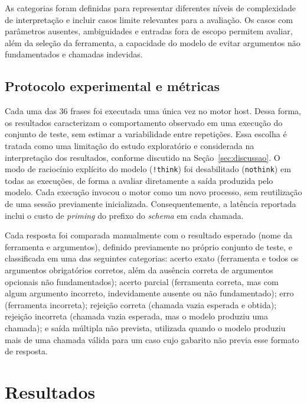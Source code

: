 \documentclass[12pt]{article}
\begin{document}
As categorias foram definidas para representar diferentes níveis de
complexidade de interpretação e incluir casos limite relevantes para a
avaliação. Os casos com parâmetros ausentes, ambiguidades e entradas fora
de escopo permitem avaliar, além da seleção da ferramenta, a capacidade
do modelo de evitar argumentos não fundamentados e chamadas indevidas.

\subsection{Protocolo experimental e métricas}

Cada uma das 36 frases foi executada uma única vez no motor host. Dessa
forma, os resultados caracterizam o comportamento observado em uma
execução do conjunto de teste, sem estimar a variabilidade entre
repetições. Essa escolha é tratada como uma limitação do estudo
exploratório e considerada na interpretação dos resultados, conforme
discutido na Seção~\ref{sec:discussao}. O modo de raciocínio explícito do
modelo (\texttt{!think}) foi desabilitado (\texttt{nothink}) em todas as
execuções, de forma a avaliar diretamente a saída produzida pelo modelo.
Cada execução invocou o motor como um novo processo, sem reutilização de
uma sessão previamente inicializada. Consequentemente, a latência
reportada inclui o custo de \textit{priming} do prefixo do \textit{schema}
em cada chamada.

Cada resposta foi comparada manualmente com o resultado esperado (nome da
ferramenta e argumentos), definido previamente no próprio conjunto de
teste, e classificada em uma das seguintes categorias: acerto exato
(ferramenta e todos os argumentos obrigatórios corretos, além da ausência
correta de argumentos opcionais não fundamentados); acerto parcial
(ferramenta correta, mas com algum argumento incorreto, indevidamente
ausente ou não fundamentado); erro (ferramenta incorreta); rejeição
correta (chamada vazia esperada e obtida); rejeição incorreta (chamada
vazia esperada, mas o modelo produziu uma chamada); e saída múltipla não
prevista, utilizada quando o modelo produziu mais de uma chamada válida
para um caso cujo gabarito não previa esse formato de resposta.


\section{Resultados}
\label{sec:resultados}
\end{document}

